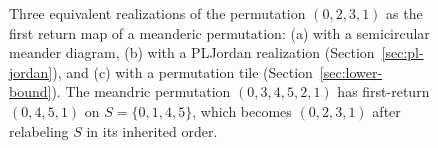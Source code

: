 \documentclass[11pt,a4paper]{amsart}
\theoremstyle{definition}
\theoremstyle{remark}
\begin{document}
\begin{figure}[ht]
\begin{subfigure}[c]{0.25\textwidth}
{%
}
\caption{}
\end{subfigure}

\caption{
Three equivalent realizations of the permutation $(0, 2, 3, 1)$ as the first return map of a meanderic permutation:
\textup{(a)} with a semicircular meander diagram,
\textup{(b)} with a PLJordan realization (Section~\ref{sec:pl-jordan}), and
\textup{(c)} with a permutation tile (Section~\ref{sec:lower-bound}).
The meandric permutation
$(0,3,4,5,2,1)$ has first-return $(0,4,5,1)$ on
$S=\{0,1,4,5\}$, which becomes $(0,2,3,1)$ after relabeling $S$ in its
inherited order.}
\label{fig:mjd}
\end{figure}
\end{document}
